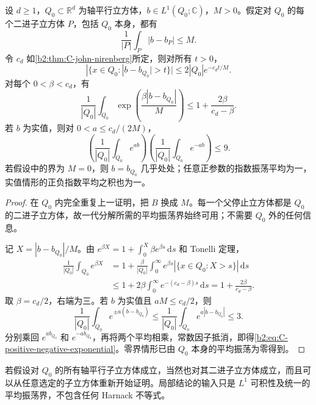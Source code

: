 \begin{corollary}[局部指数可积与正负小幂]\label{b2:cor:C-local-john-nirenberg}
设 \(d\geq1\)，\(Q_0\subset\mathbb R^d\) 为轴平行立方体，\(b\in L^1(Q_0;\mathbb C)\)，\(M>0\)。假定对 \(Q_0\) 的每个二进子立方体 \(P\)，包括 \(Q_0\) 本身，都有
\[
 \frac1{|P|}\int_P|b-b_P|\leq M.
\]
令 \(c_d\) 如\cref{b2:thm:C-john-nirenberg}所定，则对所有 \(t>0\)，
\[
 |\{x\in Q_0:|b-b_{Q_0}|>t\}|
 \leq2|Q_0|e^{-c_dt/M}.
\]
对每个 \(0<\beta<c_d\)，有
\begin{equation}\label{b2:eq:C-local-exponential}
 \frac1{|Q_0|}\int_{Q_0}
       \exp\left(\frac{\beta|b-b_{Q_0}|}{M}\right)
 \leq1+\frac{2\beta}{c_d-\beta}.
\end{equation}
若 \(b\) 为实值，则对 \(0<a\leq c_d/(2M)\)，
\begin{equation}\label{b2:eq:C-positive-negative-exponential}
 \left(\frac1{|Q_0|}\int_{Q_0}e^{ab}\right)
 \left(\frac1{|Q_0|}\int_{Q_0}e^{-ab}\right)\leq9.
\end{equation}
若假设中的界为 \(M=0\)，则 \(b=b_{Q_0}\) 几乎处处；任意正参数的指数振荡平均为一，实值情形的正负指数平均之积也为一。
\end{corollary}
\begin{proof}
在 \(Q_0\) 内完全重复上一证明，把 \(B\) 换成 \(M\)。每一个父停止立方体都是 \(Q_0\) 的二进子立方体，故一代分解所需的平均振荡界始终可用；不需要 \(Q_0\) 外的任何信息。

记 \(X=|b-b_{Q_0}|/M\)。由
\(e^{\beta X}=1+\int_0^X\beta e^{\beta s}\,\mathrm ds\) 和 Tonelli 定理，
\[
 \begin{aligned}
 \frac1{|Q_0|}\int_{Q_0}e^{\beta X}
 &=1+\frac{\beta}{|Q_0|}\int_0^\infty
       e^{\beta s}|\{x\in Q_0:X>s\}|\,\mathrm ds\\
 &\leq1+2\beta\int_0^\infty e^{-(c_d-\beta)s}\,\mathrm ds
 =1+\frac{2\beta}{c_d-\beta}.
 \end{aligned}
\]
取 \(\beta=c_d/2\)，右端为三。若 \(b\) 为实值且 \(aM\leq c_d/2\)，则
\[
 \frac1{|Q_0|}\int_{Q_0}e^{\pm a(b-b_{Q_0})}
 \leq\frac1{|Q_0|}\int_{Q_0}e^{a|b-b_{Q_0}|}\leq3.
\]
分别乘回 \(e^{ab_{Q_0}}\) 和 \(e^{-ab_{Q_0}}\)，再将两个平均相乘，常数因子抵消，即得\eqref{b2:eq:C-positive-negative-exponential}。零界情形已由 \(Q_0\) 本身的平均振荡为零得到。
\end{proof}
若假设对 \(Q_0\) 的所有轴平行子立方体成立，当然也对其二进子立方体成立，而且可以从任意选定的子立方体重新开始证明。局部结论的输入只是 \(L^1\) 可积性及统一的平均振荡界，不包含任何 Harnack 不等式。

\ProseParagraphBreak

